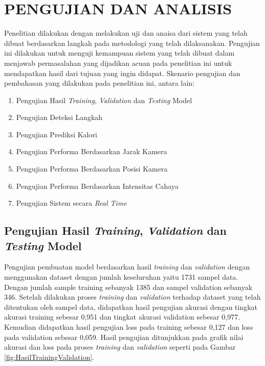 \chapter{PENGUJIAN DAN ANALISIS}
\label{chap:pengujiananalisis}


Penelitian dilakukan dengan melakukan uji dan anaisa dari sistem yang telah dibuat berdasarkan langkah pada metodologi yang telah dilaksanakan. Pengujian ini dilakukan untuk menguji kemampuan sistem yang telah dibuat dalam menjawab permasalahan yang dijadikan acuan pada penelitian ini untuk mendapatkan hasil dari tujuan yang ingin didapat. Skenario pengujian dan pembahasan yang dilakukan pada penelitian ini, antara lain:

\begin{enumerate}[nolistsep]

  \item Pengujian Hasil \emph{Training}, \emph{Validation} dan \emph{Testing} Model

  \item Pengujian Deteksi Langkah 

  \item Pengujian Prediksi Kalori
  
  \item Pengujian Performa Berdasarkan Jarak Kamera
  
  \item Pengujian Performa Berdasarkan Posisi Kamera
  
  \item Pengujian Performa Berdasarkan Intensitas Cahaya
  
  \item Pengujian Sistem secara \emph{Real Time}

\end{enumerate}

\section{Pengujian Hasil \emph{Training}, \emph{Validation} dan \emph{Testing} Model}
\label{sec:PengujianTrainingValidation}

Pengujian pembuatan model berdasarkan hasil \emph{training} dan \emph{validation} dengan menggunakan dataset dengan jumlah keseluruhan yaitu 1731 sampel data. Dengan jumlah sample training sebanyak 1385 dan sampel validation sebanyak 346. Setelah dilakukan proses \emph{training} dan \emph{validation} terhadap dataset yang telah ditentukan oleh sampel data, didapatkan hasil pengujian akurasi dengan tingkat akurasi training sebesar 0,951 dan tingkat akurasi validation sebesar 0,977. Kemudian didapatkan hasil pengujian loss pada training sebesar 0,127 dan loss pada validation sebesar 0,059. Hasil pengujian ditunjukkan pada grafik nilai akurasi dan loss pada proses \emph{training} dan \emph{validation} seperti pada Gambar \ref{fig:HasilTrainingValidation}.

